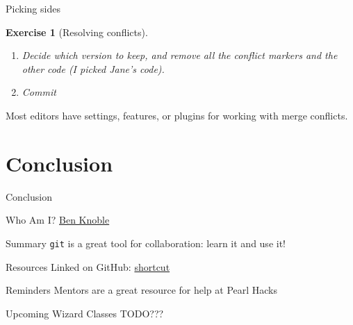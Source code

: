 \documentclass{beamer}
\theoremstyle{example}
\newtheorem{exercise}{Exercise}
\begin{document}
\begin{frame}{Picking sides}
    \begin{exercise}[Resolving conflicts]
        \begin{enumerate}
            \item Decide which version to keep, and remove all the conflict
                markers and the other code (I picked Jane's code).
            \item Commit
        \end{enumerate}
    \end{exercise}

    Most editors have settings, features, or plugins for working with merge
    conflicts.
\end{frame}

\part{Conclusion}
\begin{frame}{Conclusion}
    \begin{block}{Who Am I?}
        \href{https://benknoble.github.io}{Ben Knoble}
    \end{block}
    \begin{block}{Summary}
        \texttt{git} is a great tool for collaboration: learn it and use it!
    \end{block}
    \begin{block}{Resources}
        Linked on GitHub:
        \href{https://github.com/benknoble/git-wizard-content}{shortcut}
    \end{block}
    \begin{block}{Reminders}
        Mentors are a great resource for help at Pearl Hacks
    \end{block}
    \begin{block}{Upcoming Wizard Classes}
        TODO???
    \end{block}
\end{frame}

\end{document}
